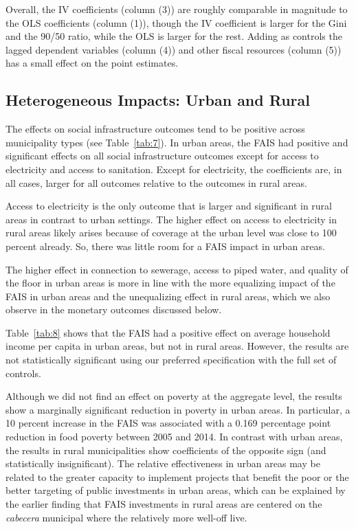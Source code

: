 \documentclass[dv_diss_main.tex]{subfiles}
\begin{document}
Overall, the IV coefficients (column (3)) are roughly comparable in magnitude to the OLS coefficients (column (1)), though the IV coefficient is larger for the Gini and the 90/50 ratio, while the OLS is larger for the rest. Adding as controls the lagged dependent variables (column (4)) and other fiscal resources (column (5)) has a small effect on the point estimates.

\subsection{Heterogeneous Impacts: Urban and Rural} \label{subsec:heterogeneous} 

The effects on social infrastructure outcomes tend to be positive across municipality types (see Table~\ref{tab:7}). In urban areas, the FAIS had positive and significant effects on all social infrastructure outcomes except for access to electricity and access to sanitation. Except for electricity, the coefficients are, in all cases, larger for all outcomes relative to the outcomes in rural areas.

Access to electricity is the only outcome that is larger and significant in rural areas in contrast to urban settings. The higher effect on access to electricity in rural areas likely arises because of coverage at the urban level was close to 100 percent already. So, there was little room for a FAIS impact in urban areas.

 The higher effect in connection to sewerage, access to piped water, and quality of the floor in urban areas is more in line with the more equalizing impact of the FAIS in urban areas and the unequalizing effect in rural areas, which we also observe in the monetary outcomes discussed below.

Table~\ref{tab:8} shows that the FAIS had a positive effect on average household income per capita in urban areas, but not in rural areas. However, the results are not statistically significant using our preferred specification with the full set of controls.

Although we did not find an effect on poverty at the aggregate level, the results show a marginally significant reduction in poverty in urban areas. In particular, a 10 percent increase in the FAIS was associated with a 0.169 percentage point reduction in food poverty between 2005 and 2014. In contrast with urban areas, the results in rural municipalities show coefficients of the opposite sign (and statistically insignificant). The relative effectiveness in urban areas may be related to the greater capacity to implement projects that benefit the poor or the better targeting of public investments in urban areas, which can be explained by the earlier finding that FAIS investments in rural areas are centered on the \textit{cabecera} municipal where the relatively more well-off live.
\end{document}
